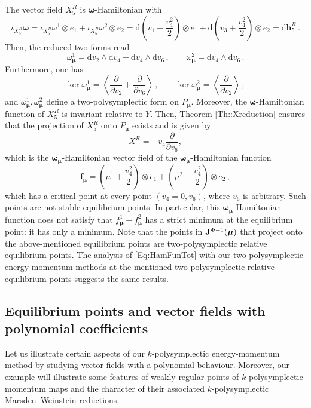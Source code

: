 \documentclass[11pt]{article}
\theoremstyle{plain}
\theoremstyle{definition}
\newcommand{\bomega}{{\boldsymbol{\omega}}}
\newcommand{\bh}{{\boldsymbol{h}}}
\renewcommand{\d}{\mathrm{d}}
\newcommand{\parder}[2]{\frac{\partial #1}{\partial #2}}
\def\d{\mathrm{d}}
\numberwithin{equation}{section}
\begin{document}
The vector field $X_5^R$ is $\bm\omega$-Hamiltonian with
\begin{equation}\label{Eq:HamFunTot}
\iota_{X_5^R}\bm\omega=\iota_{X_5^R}\omega^1\otimes e_1+\iota_{X_5^R}\omega^2\otimes e_2 = \d\left(v_1 + \frac{v_4^2}{2}\right)\otimes e_1+ \d\left(v_3 + \frac{v_4^2}{2}\right)\otimes e_2=\d \bh^R_5\,.
\end{equation}
Then, the reduced two-forms read
$$
\omega^1_{\bm\mu} = \d v_2\wedge\d v_4 + \d v_4\wedge\d v_6\,,\qquad \omega^2_{\bm\mu} = \d v_4\wedge\d v_6\,.
$$
Furthermore, one has
$$ \ker\omega^1_{\bm\mu} = \left\langle \parder{}{v_2} + \parder{}{v_6} \right\rangle\,,\qquad \ker\omega^2_{\bm\mu} = \left\langle \parder{}{v_2} \right\rangle\,, $$
and $\omega_{\bm\mu}^1,\omega_{\bm \mu}^2$ define a two-polysymplectic form on $P_{\bm\mu}$. Moreover, the $\bomega$-Hamiltonian function of $X^R_5$ is invariant relative to $Y$. Then, Theorem \ref{Th::Xreduction} ensures that the projection of $X^R_5$ onto $P_{\bm{\mu}}$ exists and is given by
$$
X^R=-v_4\frac{\partial}{\partial v_6},
$$
which is the $\bm{\omega}_{\bm \mu}$-Hamiltonian vector field of the $\bm{\omega}_{\bm \mu}$-Hamiltonian function
$$
{\bm f}_{\bm\mu}=\left(\mu^1 + \frac{v_4^2}{2}\right)\otimes e_1+ \left(\mu^2 + \frac{v_4^2}{2}\right)\otimes e_2\,,
$$
which has a critical point at every point $(v_4=0,v_6)$, where $v_6$ is arbitrary. Such points are not stable equilibrium points. In particular, this $\bm{\omega}_{\bm\mu}$-Hamiltonian function does not satisfy that $f^1_{\bm\mu}+f^2_{\bm \mu}$ has a strict minimum at the equilibrium point: it has only a minimum. 
Note that the points in ${\bf J}^{\Phi-1}(\bm\mu)$ that project onto the above-mentioned equilibrium points are two-polysymplectic relative equilibrium points.
The analysis of \eqref{Eq:HamFunTot} with our two-polysymplectic energy-momentum methods at the mentioned two-polysymplectic relative equilibrium points suggests the same results.

\subsection{Equilibrium points and vector fields with polynomial coefficients}

Let us illustrate certain aspects of our $k$-polysymplectic energy-momentum method by studying vector fields with a polynomial behaviour. Moreover, our example will illustrate some features of weakly regular points of $k$-polysymplectic momentum maps and the character of their associated $k$-polysymplectic Marsden--Weinstein reductions. 
\end{document}
